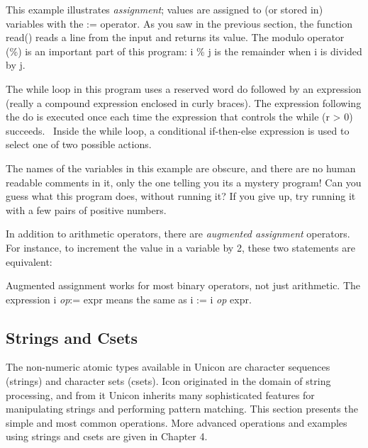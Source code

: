 This example illustrates \textit{assignment}; values
are assigned to (or {\textquotedbl}stored in{\textquotedbl}) variables
with the \textsf{:=} operator. As you saw in the previous section, the
function \textsf{read()} reads a line from the input and returns its
value. The modulo operator (\textsf{\%}) is an important part of this
program: \textsf{i \% j} is the remainder when
\textsf{i} is divided by \textsf{j}.

The while loop in this program uses a reserved word
\textsf{do} followed by an expression (really a compound expression
enclosed in curly braces). The expression following the \textsf{do }is
executed once each time the expression that controls the \textsf{while
(r {\textgreater} 0)} succeeds. \ Inside the \textsf{while} loop, a
conditional
\textsf{if-then-else} expression is used to select
one of two possible actions.

The names of the variables in this example are obscure, and there are no
human readable comments in it, only the one telling you
it{\textquotesingle}s a {\textquotedbl}mystery
program{\textquotesingle}!{\textquotedbl} Can you guess what this
program does, without running it? If you give up, try running it with a
few pairs of positive numbers.

In addition to arithmetic operators, there are \textit{augmented assignment} operators. For instance, to
increment the value in a variable by 2, these two statements are
equivalent:


Augmented assignment works for most binary
operators, not just arithmetic. The expression \textsf{i
}\textsf{\textit{op}}\textsf{:= expr} means the same as \textsf{i := i
}\textsf{\textit{op}}\textsf{ expr}.

\subsection{Strings and Csets}

The non-numeric atomic types available in Unicon are character sequences
(strings) and character sets
(csets). Icon originated in the domain of string
processing, and from it Unicon inherits many sophisticated features for
manipulating strings and performing pattern
matching. This section presents the simple and most common operations.
More advanced operations and examples using strings and csets are given
in Chapter 4.


